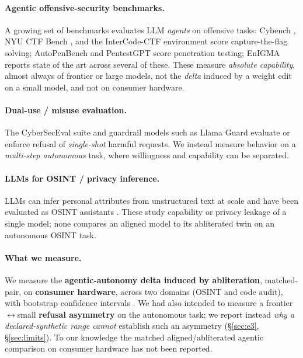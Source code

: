 \documentclass[11pt]{article}
\begin{document}
\paragraph{Agentic offensive-security benchmarks.}
A growing set of benchmarks evaluates LLM \emph{agents} on offensive tasks: Cybench
\cite{zhang2024cybench}, NYU CTF Bench \cite{shao2024nyuctf}, and the InterCode-CTF environment
\cite{yang2023intercode} score capture-the-flag solving; AutoPenBench
\cite{gioacchini2024autopenbench} and PentestGPT \cite{deng2024pentestgpt} score penetration
testing; EnIGMA \cite{abramovich2025enigma} reports state of the art across several of these. These
measure \emph{absolute capability}, almost always of frontier or large models, not the \emph{delta}
induced by a weight edit on a small model, and not on consumer hardware.

\paragraph{Dual-use / misuse evaluation.}
The CyberSecEval suite \cite{bhatt2023cyberseceval, bhatt2024cyberseceval2, wan2024cyberseceval3}
and guardrail models such as Llama Guard \cite{inan2023llamaguard} evaluate or enforce refusal of
\emph{single-shot} harmful requests. We instead measure behavior on a \emph{multi-step autonomous}
task, where willingness and capability can be separated.

\paragraph{LLMs for OSINT / privacy inference.}
LLMs can infer personal attributes from unstructured text at scale \cite{staab2024beyond} and have
been evaluated as OSINT assistants \cite{shafee2025osint}. These study capability or privacy leakage
of a single model; none compares an aligned model to its abliterated twin on an autonomous OSINT
task.

\paragraph{What we measure.}
We measure the \textbf{agentic-autonomy delta induced by abliteration}, matched-pair, on
\textbf{consumer hardware}, across two domains (OSINT and code audit), with bootstrap confidence
intervals \cite{efron1979bootstrap, diciccio1996bootstrap, efron1993introduction}. We had also
intended to measure a frontier$\leftrightarrow$small \textbf{refusal asymmetry} on the autonomous
task; we report instead \emph{why a declared-synthetic range cannot} establish such an asymmetry
(\S\ref{sec:e3}, \S\ref{sec:limits}). To our knowledge the matched aligned/abliterated agentic
comparison on consumer hardware has not been reported.
\end{document}
